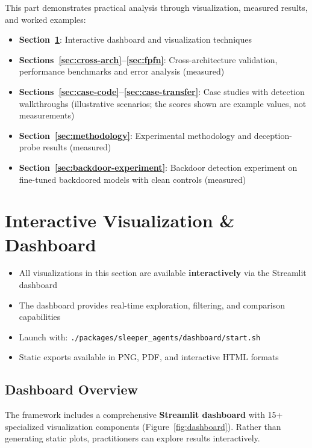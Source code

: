 \documentclass[11pt,letterpaper]{article}
\newcommand{\iconList}{\ding{118}}
\let\origsubsection\subsection
\renewcommand{\subsection}{\needspace{8\baselineskip}\origsubsection}}
\newcommand{\partoverview}[1]{%
  \begin{center}
  \begin{minipage}{0.85\textwidth}
  \begin{tcolorbox}[
    enhanced,
    colback=partcolor!5,
    colframe=partcolor!50,
    fonttitle=\bfseries,
    title={\iconList\ \ Overview},
    sharp corners,
    boxrule=0.5pt
  ]
  #1
  \end{tcolorbox}
  \end{minipage}
  \end{center}
}
\begin{document}
\partoverview{%
This part demonstrates practical analysis through visualization, measured results, and worked examples:
\begin{itemize}[nosep]
  \item \textbf{Section~\ref{sec:dashboard}}: Interactive dashboard and visualization techniques
  \item \textbf{Sections~\ref{sec:cross-arch}--\ref{sec:fpfn}}: Cross-architecture validation, performance benchmarks and error analysis (measured)
  \item \textbf{Sections~\ref{sec:case-code}--\ref{sec:case-transfer}}: Case studies with detection walkthroughs (illustrative scenarios; the scores shown are example values, not measurements)
  \item \textbf{Section~\ref{sec:methodology}}: Experimental methodology and deception-probe results (measured)
  \item \textbf{Section~\ref{sec:backdoor-experiment}}: Backdoor detection experiment on fine-tuned backdoored models with clean controls (measured)
\end{itemize}
}

\section{Interactive Visualization \& Dashboard}
\label{sec:dashboard}

\begin{tldrbox}
\begin{itemize}[nosep]
  \item All visualizations in this section are available \textbf{interactively} via the Streamlit dashboard
  \item The dashboard provides real-time exploration, filtering, and comparison capabilities
  \item Launch with: \texttt{./packages/sleeper\_agents/dashboard/start.sh}
  \item Static exports available in PNG, PDF, and interactive HTML formats
\end{itemize}
\end{tldrbox}

\subsection{Dashboard Overview}

The framework includes a comprehensive \textbf{Streamlit dashboard} with 15+ specialized visualization components (Figure~\ref{fig:dashboard}). Rather than generating static plots, practitioners can explore results interactively.
\end{document}
